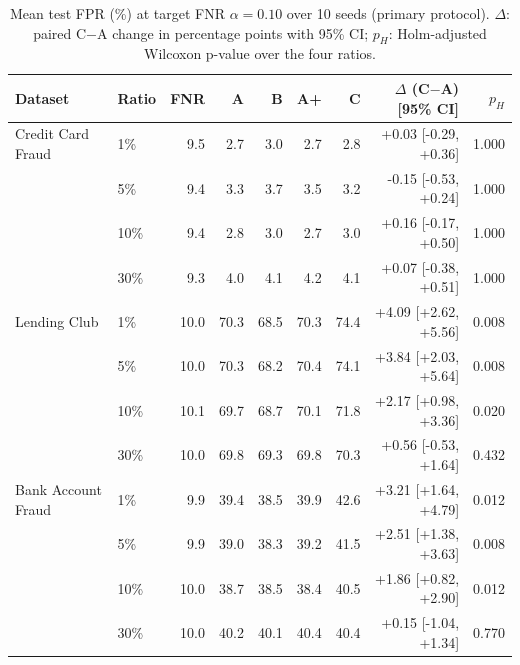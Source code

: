 \begin{table}[t]
\centering
\caption{Mean test FPR (\%) at target FNR $\alpha=0.10$ over 10 seeds (primary protocol). $\Delta$: paired C$-$A change in percentage points with 95\% CI; $p_H$: Holm-adjusted Wilcoxon p-value over the four ratios.}
\label{tab:primary}
\setlength{\tabcolsep}{3pt}
\begin{tabular}{llrrrrrrr}
\hline
Dataset & Ratio & FNR & A & B & A+ & C & $\Delta$ (C$-$A) [95\% CI] & $p_H$ \\
\hline
Credit Card Fraud & 1\% & 9.5 & 2.7 & 3.0 & 2.7 & 2.8 & +0.03 [-0.29, +0.36] & 1.000 \\
 & 5\% & 9.4 & 3.3 & 3.7 & 3.5 & 3.2 & -0.15 [-0.53, +0.24] & 1.000 \\
 & 10\% & 9.4 & 2.8 & 3.0 & 2.7 & 3.0 & +0.16 [-0.17, +0.50] & 1.000 \\
 & 30\% & 9.3 & 4.0 & 4.1 & 4.2 & 4.1 & +0.07 [-0.38, +0.51] & 1.000 \\
\hline
Lending Club & 1\% & 10.0 & 70.3 & 68.5 & 70.3 & 74.4 & +4.09 [+2.62, +5.56] & 0.008 \\
 & 5\% & 10.0 & 70.3 & 68.2 & 70.4 & 74.1 & +3.84 [+2.03, +5.64] & 0.008 \\
 & 10\% & 10.1 & 69.7 & 68.7 & 70.1 & 71.8 & +2.17 [+0.98, +3.36] & 0.020 \\
 & 30\% & 10.0 & 69.8 & 69.3 & 69.8 & 70.3 & +0.56 [-0.53, +1.64] & 0.432 \\
\hline
Bank Account Fraud & 1\% & 9.9 & 39.4 & 38.5 & 39.9 & 42.6 & +3.21 [+1.64, +4.79] & 0.012 \\
 & 5\% & 9.9 & 39.0 & 38.3 & 39.2 & 41.5 & +2.51 [+1.38, +3.63] & 0.008 \\
 & 10\% & 10.0 & 38.7 & 38.5 & 38.4 & 40.5 & +1.86 [+0.82, +2.90] & 0.012 \\
 & 30\% & 10.0 & 40.2 & 40.1 & 40.4 & 40.4 & +0.15 [-1.04, +1.34] & 0.770 \\
\hline
\end{tabular}
\end{table}